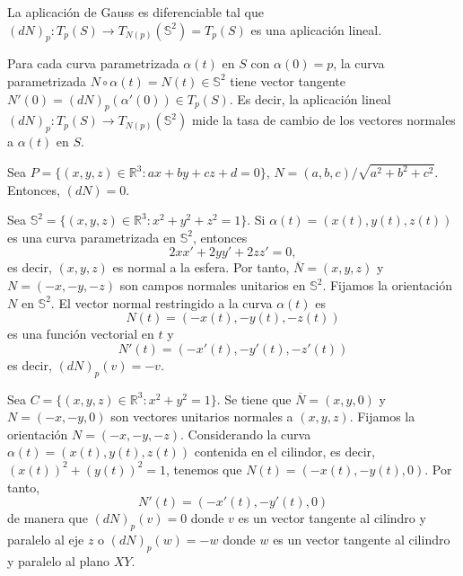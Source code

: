\begin{obs}
  La aplicación de Gauss es diferenciable tal que $(d N)_{p} : T_{p}(S) \to T_{N(p)}(\mathbb{S}^{2}) = T_{p}(S)$ es una aplicación lineal. 
\end{obs}

\begin{note}
  Para cada curva parametrizada $\alpha(t)$ en $S$ con $\alpha(0) = p$, la curva parametrizada $N \circ \alpha(t) = N(t) \in \mathbb{S}^{2}$ tiene vector tangente $N'(0) = (d N)_{p}(\alpha'(0)) \in T_{p}(S)$. Es decir, la aplicación lineal $(d N)_{p} : T_{p}(S) \to T_{N(p)}(\mathbb{S}^{2})$ mide la tasa de cambio de los vectores normales a $\alpha(t)$ en $S$.
\end{note}

\begin{ejm}[Plano]
  Sea $P = \{ (x, y, z) \in \mathbb{R}^{3} : ax + by + cz + d = 0\}$, $N = (a, b, c) / \sqrt{a^{2} + b ^{2} + c^{2}}$. Entonces, $(d N) = 0$.
\end{ejm}

\begin{ejm}[Esfera]
  Sea $\mathbb{S}^{2} = \{ (x, y, z) \in \mathbb{R}^{3} : x^{2} + y^{2} + z^{2} = 1 \}$. Si $\alpha(t) = (x(t), y(t), z(t))$ es una curva parametrizada en $\mathbb{S}^{2}$, entonces
  \[ 
    2xx' + 2yy' + 2zz' = 0,
  \] 
  es decir, $(x, y, z)$ es normal a la esfera. Por tanto, $\overline{N} = (x, y, z)$ y $N = (-x, -y, -z)$ son campos normales unitarios en $\mathbb{S}^{2}$. Fijamos la orientación $N$ en $\mathbb{S}^{2}$. El vector normal restringido a la curva $\alpha(t)$ es 
  \[ 
    N(t) = (-x(t), -y(t), -z(t)) 
  \] 
  es una función vectorial en $t$ y
  \[ 
    N'(t) = (-x'(t), -y'(t), -z'(t))  
  \]
  es decir, $(d N)_{p}(v) = - v$.
\end{ejm}

\begin{ejm}[Cilindro]
  Sea $C = \{ (x, y, z) \in \mathbb{R}^{3} : x^{2} + y^{2} = 1 \}$. Se tiene que $\overline{N} = (x, y, 0)$ y $N = (-x, -y, 0)$ son vectores unitarios normales a $(x, y, z)$. Fijamos la orientación $N = (-x, -y, -z)$. Considerando la curva $\alpha(t) = (x(t), y(t), z(t))$ contenida en el cilindor, es decir, $(x(t))^{2} + (y(t))^{2} = 1$, tenemos que $N(t) = (-x(t), -y(t), 0)$. Por tanto,
  \[ 
    N'(t) = (-x'(t), -y'(t), 0) 
  \] 
  de manera que $(d N)_{p}(v) = 0$ donde $v$ es un vector tangente al cilindro y paralelo al eje $z$ o $(d N)_{p}(w) = -w$ donde $w$ es un vector tangente al cilindro y paralelo al plano $XY$.
\end{ejm}

